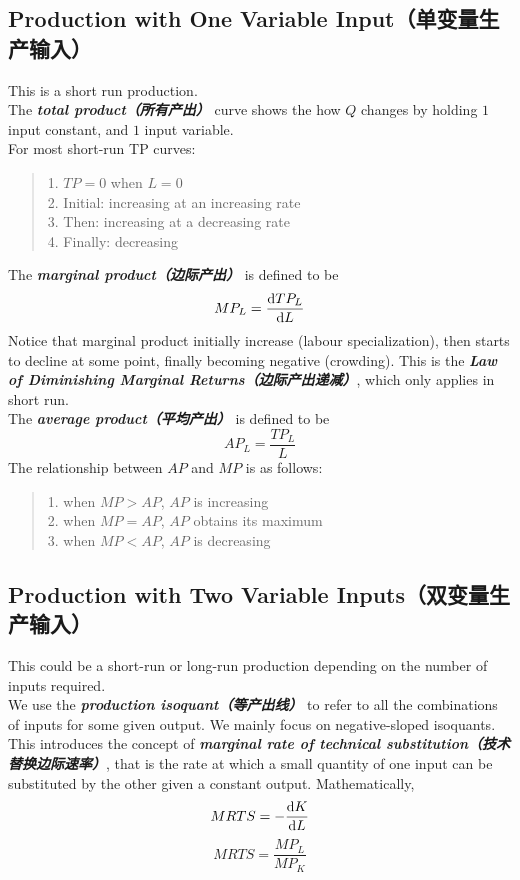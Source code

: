 \subsection{Production with One Variable Input（单变量生产输入）}
This is a short run production. \\
The \textbf{\textit{total product（所有产出）}} curve shows the how $Q$ changes by holding $1$ input constant, and $1$ input variable. \\
For most short-run TP curves:
\begin{quote}
    1. $TP = 0$ when $L = 0$ \\
    2. Initial: increasing at an increasing rate \\
    3. Then: increasing at a decreasing rate \\
    4. Finally: decreasing
\end{quote}
The \textbf{\textit{marginal product（边际产出）}} is defined to be
$$MP_L = \dv{TP_L}{L}$$
Notice that marginal product initially increase (labour specialization), then starts to decline at some point, finally becoming negative (crowding). This is the \textbf{\textit{Law of Diminishing Marginal Returns（边际产出递减）}}, which only applies in short run. \\
The \textbf{\textit{average product（平均产出）}} is defined to be
$$AP_L = \frac{TP_L}{L}$$
The relationship between $AP$ and $MP$ is as follows: 
\begin{quote}
    1. when $MP > AP$, $AP$ is increasing \\
    2. when $MP = AP$, $AP$ obtains its maximum \\
    3. when $MP < AP$, $AP$ is decreasing
\end{quote}

\subsection{Production with Two Variable Inputs（双变量生产输入）}
This could be a short-run or long-run production depending on the number of inputs required. \\
We use the \textbf{\textit{production isoquant（等产出线）}} to refer to all the combinations of inputs for some given output. We mainly focus on negative-sloped isoquants. \\
This introduces the concept of \textbf{\textit{marginal rate of technical substitution（技术替换边际速率）}}, that is the rate at which a small quantity of one input can be substituted by the other given a constant output. Mathematically,
$$MRTS = -\dv{K}{L}$$
$$MRTS = \frac{MP_L}{MP_K}$$

